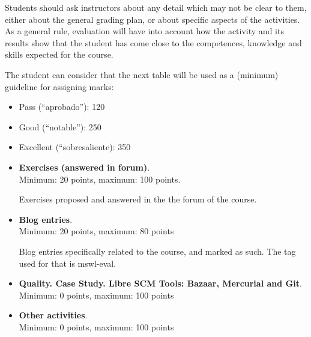 \documentclass[a4paper]{article}
\begin{document}
Students should ask instructors about any detail which may not be clear to them, either about the general grading plan, or about specific aspects of the activities. As a general rule, evaluation will have into account how the activity and its results show that the student has come close to the competences, knowledge and skills expected for the course.

The student can consider that the next table will be used as a (minimum) guideline for assigning marks:

\begin{itemize}
\item Pass (``aprobado''): 120
\item Good (``notable''): 250
\item Excellent (``sobresaliente): 350
\end{itemize}

\begin{itemize}
\item \textbf{Exercises (answered in forum)}. \\
  Minimum: 20 points, maximum: 100 points.

  Exercises proposed and answered in the the forum of the course.

\item \textbf{Blog entries}. \\
  Minimum: 20 points, maximum: 80 points

  Blog entries specifically related to the course, and marked as such. The tag used for that is mswl-eval.

\item \textbf{Quality. Case Study. Libre SCM Tools: Bazaar, Mercurial and Git}. \\
  Minimum: 0 points, maximum: 100 points

\item \textbf{Other activities}. \\
  Minimum: 0 points, maximum: 100 points

\end{itemize}
\end{document}
